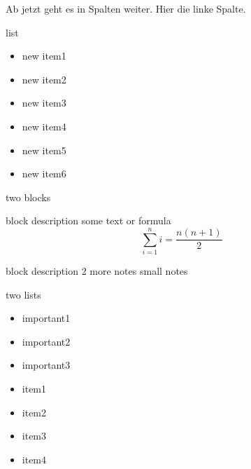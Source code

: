 \documentclass[final]{beamer} %
\begin{document}
\begin{frame}
  \begin{minipage}[t]{.49\textwidth}
Ab jetzt geht es in Spalten weiter. Hier die linke Spalte.
    \begin{kasten}{\large list}
      \begin{itemize}
        \item new item1
        \item new item2
        \item new item3
        \item new item4
        \item new item5
        \item new item6
      \end{itemize}
    \end{kasten}
    \begin{kasten}{\large two blocks}
      \begin{kasten2}{block description}
        some text or formula $$\sum\limits_{i=1}^n i = \frac{n (n+1)}{2}$$
      \end{kasten2}
      \begin{kasten2}{block description 2}
        more notes {\tiny small notes}
      \end{kasten2}
    \end{kasten}
    \begin{kasten}{\large two lists}
      \begin{itemize}
        \item important1 \cite{Feher13}
        \item important2
        \item important3
      \end{itemize}
      \begin{itemize}
        \item item1 \cite{Koenies12}
        \item item2
        \item item3
        \item item4
      \end{itemize}
    \end{kasten}

\end{minipage}
\end{frame}
\end{document}
